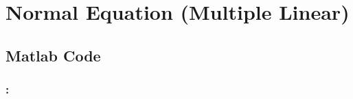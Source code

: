 \documentclass[xcolor=dvipsnames,11pt]{beamer}
\begin{document}
\section{Normal Equation (Multiple Linear)}

\subsection{Matlab Code}

\begin{frame}	
\frametitle{\secname: \subsecname}
\vspace{-7pt}	


\end{frame}
\end{document}
